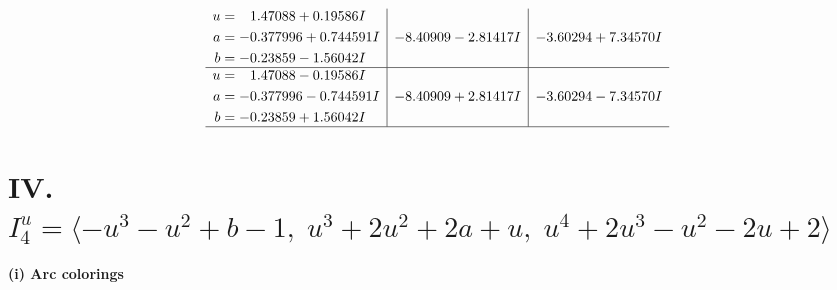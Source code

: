 \documentclass[1p]{elsarticle_modified}
\theoremstyle{definition}
\begin{document}
$$\begin{array}{c|c|c}
\begin{aligned}
u &= \phantom{-}1.47088 + 0.19586 I \\
a &= -0.377996 + 0.744591 I \\
b &= -0.23859 - 1.56042 I\end{aligned}
 & -8.40909 - 2.81417 I & -3.60294 + 7.34570 I \\ \hline\begin{aligned}
u &= \phantom{-}1.47088 - 0.19586 I \\
a &= -0.377996 - 0.744591 I \\
b &= -0.23859 + 1.56042 I\end{aligned}
 & -8.40909 + 2.81417 I & -3.60294 - 7.34570 I\\
 \hline 
 \end{array}$$\newpage\newpage\renewcommand{\arraystretch}{1}
\centering \section*{IV. $I^u_{4}= \langle - u^3- u^2+b-1,\;u^3+2 u^2+2 a+u,\;u^4+2 u^3- u^2-2 u+2 \rangle$}
\flushleft \textbf{(i) Arc colorings}\\
\end{document}
